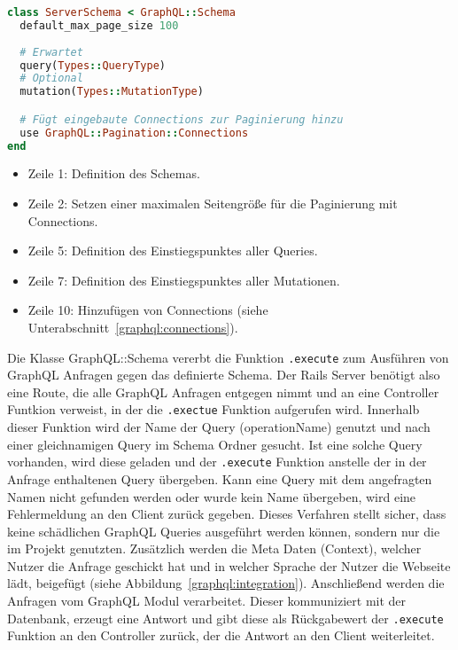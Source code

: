 \begin{lstlisting}[language=Ruby,float=h!,caption={graphql-ruby Schema Definition und Festlegung der Einstiegpunkte query und mutation}, label={lst:graphql:schema}]
class ServerSchema < GraphQL::Schema
  default_max_page_size 100
  
  # Erwartet
  query(Types::QueryType)
  # Optional
  mutation(Types::MutationType)

  # Fügt eingebaute Connections zur Paginierung hinzu
  use GraphQL::Pagination::Connections
end
\end{lstlisting}

\begin{itemize}
	\setlength\itemsep{-1em}
	\item Zeile 1: Definition des Schemas.
	\item Zeile 2: Setzen einer maximalen Seitengröße für die Paginierung mit Connections.
	\item Zeile 5: Definition des Einstiegspunktes aller Queries.
	\item Zeile 7: Definition des Einstiegspunktes aller Mutationen.
	\item Zeile 10: Hinzufügen von Connections (siehe Unterabschnitt~\ref{graphql:connections}).
\end{itemize}

Die Klasse GraphQL::Schema vererbt die Funktion \texttt{.execute} zum Ausführen von GraphQL Anfragen gegen das definierte Schema. Der Rails Server benötigt also eine Route, die alle GraphQL Anfragen entgegen nimmt und an eine Controller Funtkion verweist, in der die \texttt{.exectue} Funktion aufgerufen wird. Innerhalb dieser Funktion wird der Name der Query (operationName) genutzt und nach einer gleichnamigen Query im Schema Ordner gesucht. Ist eine solche Query vorhanden, wird diese geladen und der \texttt{.execute} Funktion anstelle der in der Anfrage enthaltenen Query übergeben.
Kann eine Query mit dem angefragten Namen nicht gefunden werden oder wurde kein Name übergeben, wird eine Fehlermeldung an den Client zurück gegeben. Dieses Verfahren stellt sicher, dass keine schädlichen GraphQL Queries ausgeführt werden können, sondern nur die im Projekt genutzten.
Zusätzlich werden die Meta Daten (Context), welcher Nutzer die Anfrage geschickt hat und in welcher Sprache der Nutzer die Webseite lädt, beigefügt (siehe Abbildung~\ref{graphql:integration}). Anschließend werden die Anfragen vom GraphQL Modul verarbeitet. Dieser kommuniziert mit der Datenbank, erzeugt eine Antwort und gibt diese als Rückgabewert der \texttt{.execute} Funktion an den Controller zurück, der die Antwort an den Client weiterleitet.

